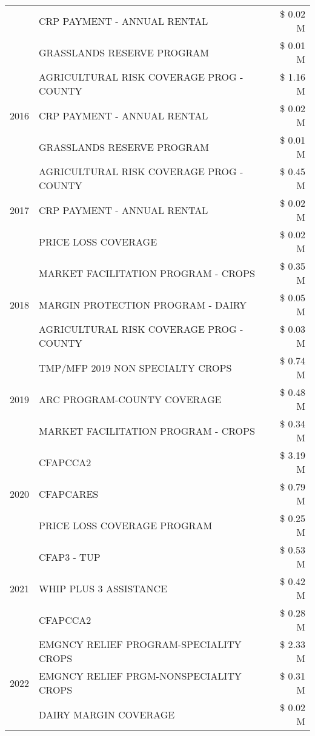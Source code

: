 \begin{tabular}{llr}
 & CRP PAYMENT - ANNUAL RENTAL & \$ 0.02 M \\
 & GRASSLANDS RESERVE PROGRAM & \$ 0.01 M \\
\cline{1-3}
\multirow[t]{3}{*}{2016} & AGRICULTURAL RISK COVERAGE PROG - COUNTY & \$ 1.16 M \\
 & CRP PAYMENT - ANNUAL RENTAL & \$ 0.02 M \\
 & GRASSLANDS RESERVE PROGRAM & \$ 0.01 M \\
\cline{1-3}
\multirow[t]{3}{*}{2017} & AGRICULTURAL RISK COVERAGE PROG - COUNTY & \$ 0.45 M \\
 & CRP PAYMENT - ANNUAL RENTAL & \$ 0.02 M \\
 & PRICE LOSS COVERAGE & \$ 0.02 M \\
\cline{1-3}
\multirow[t]{3}{*}{2018} & MARKET FACILITATION PROGRAM - CROPS & \$ 0.35 M \\
 & MARGIN PROTECTION PROGRAM - DAIRY & \$ 0.05 M \\
 & AGRICULTURAL RISK COVERAGE PROG - COUNTY & \$ 0.03 M \\
\cline{1-3}
\multirow[t]{3}{*}{2019} & TMP/MFP 2019 NON SPECIALTY CROPS & \$ 0.74 M \\
 & ARC PROGRAM-COUNTY COVERAGE & \$ 0.48 M \\
 & MARKET FACILITATION PROGRAM - CROPS & \$ 0.34 M \\
\cline{1-3}
\multirow[t]{3}{*}{2020} & CFAPCCA2 & \$ 3.19 M \\
 & CFAPCARES & \$ 0.79 M \\
 & PRICE LOSS COVERAGE PROGRAM & \$ 0.25 M \\
\cline{1-3}
\multirow[t]{3}{*}{2021} & CFAP3 - TUP & \$ 0.53 M \\
 & WHIP PLUS 3 ASSISTANCE & \$ 0.42 M \\
 & CFAPCCA2 & \$ 0.28 M \\
\cline{1-3}
\multirow[t]{3}{*}{2022} & EMGNCY RELIEF PROGRAM-SPECIALITY CROPS & \$ 2.33 M \\
 & EMGNCY RELIEF PRGM-NONSPECIALITY CROPS & \$ 0.31 M \\
 & DAIRY MARGIN COVERAGE & \$ 0.02 M \\
\cline{1-3}
\bottomrule
\end{tabular}
